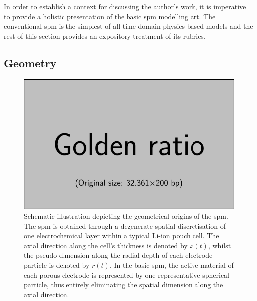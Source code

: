 
In  order  to establish  a  context  for discussing  the  author's  work, it  is
imperative to provide  a holistic presentation of the  basic \gls{spm} modelling
art. The conventional \gls{spm} is the simplest of all time domain physics-based
models and  the rest  of this  section provides an  expository treatment  of its
rubrics.

\subsection{Geometry}\label{subsec:basicspmgeometry}

\begin{figure}[h]
    \centering
    \includegraphics{placeholder_images/example-image-golden.pdf}
    \caption[Schematic illustration depicting geometrical origins of the
    ]
    {Schematic illustration depicting the geometrical origins of the \gls{spm}.
        The \gls{spm} is obtained through a degenerate spatial discretisation of one
        electrochemical layer within a typical Li-ion pouch cell. The axial direction
        along the cell's thickness is denoted by $x(t)$, whilst the pseudo-dimension
        along the radial depth of each electrode particle is denoted by $r(t)$. In the
        basic \gls{spm}, the active material of each porous electrode is represented by
        one representative spherical particle, thus entirely eliminating the spatial
    dimension along the axial direction.}
    \label{fig:sandwichtospm}
\end{figure}



